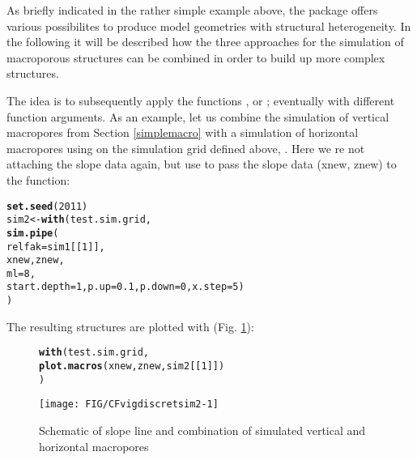 \documentclass[article,nojss]{jss}\usepackage[]{graphicx}\usepackage[]{xcolor}
\makeatletter
\def\maxwidth{ %
  \ifdim\Gin@nat@width>\linewidth
    \linewidth
  \else
    \Gin@nat@width
  \fi
}
\newcommand{\hlnum}[1]{\textcolor[rgb]{0.686,0.059,0.569}{#1}}%
\newcommand{\hldef}[1]{\textcolor[rgb]{0.345,0.345,0.345}{#1}}%
\newcommand{\hlkwb}[1]{\textcolor[rgb]{0.69,0.353,0.396}{#1}}%
\newcommand{\hlkwc}[1]{\textcolor[rgb]{0.333,0.667,0.333}{#1}}%
\newcommand{\hlkwd}[1]{\textcolor[rgb]{0.737,0.353,0.396}{\textbf{#1}}}%
\newenvironment{kframe}{%
 \def\at@end@of@kframe{}%
 \ifinner\ifhmode%
  \def\at@end@of@kframe{\end{minipage}}%
  \begin{minipage}{\columnwidth}%
 \fi\fi%
 \def\FrameCommand##1{\hskip\@totalleftmargin \hskip-\fboxsep
 \colorbox{shadecolor}{##1}\hskip-\fboxsep
     \hskip-\linewidth \hskip-\@totalleftmargin \hskip\columnwidth}%
 \MakeFramed {\advance\hsize-\width
   \@totalleftmargin\z@ \linewidth\hsize
   \@setminipage}}%
 {\par\unskip\endMakeFramed%
 \at@end@of@kframe}
\newenvironment{knitrout}{}{} %
\makeatother
\begin{document}
As briefly indicated in the rather simple example above, the  package offers 
various possibilites to produce model geometries with structural heterogeneity.    
In the following it will be described how the three approaches for the simulation of 
macroporous structures can be combined in order to build up more complex structures.

The idea is to subsequently apply the functions ,  or 
; eventually with different function arguments. As an example, let us 
combine the simulation of vertical macropores from Section \ref{simplemacro} 
with a simulation of horizontal macropores using  on the simulation grid 
defined above, . Here we re not attaching the slope data again, but use  to pass the slope data (xnew, znew) to the function:

\begin{knitrout}
\color{fgcolor}\begin{kframe}
\begin{alltt}
  \hlkwd{set.seed}\hldef{(}\hlnum{2011}\hldef{)}
  \hldef{sim2} \hlkwb{<-} \hlkwd{with}\hldef{(test.sim.grid,}
               \hlkwd{sim.pipe}\hldef{(}
                  \hlkwc{relfak} \hldef{= sim1[[}\hlnum{1}\hldef{]],}
                  \hldef{xnew, znew,}
                  \hlkwc{ml} \hldef{=} \hlnum{8}\hldef{,}
                  \hlkwc{start.depth}\hldef{=}\hlnum{1}\hldef{,} \hlkwc{p.up} \hldef{=}\hlnum{0.1}\hldef{,} \hlkwc{p.down}\hldef{=}\hlnum{0}\hldef{,} \hlkwc{x.step}\hldef{=}\hlnum{5}\hldef{)}
  \hldef{)}
\end{alltt}
\end{kframe}
\end{knitrout}


The resulting structures are plotted with  (Fig. \ref{fig:macsim2}):

\begin{figure}[h]
\begin{center}
\begin{knitrout}
\color{fgcolor}\begin{kframe}
\begin{alltt}
\hlkwd{with}\hldef{(test.sim.grid,}
      \hlkwd{plot.macros}\hldef{(xnew, znew, sim2[[}\hlnum{1}\hldef{]])}
\hldef{)}
\end{alltt}
\end{kframe}
\texttt{[image: FIG/CFvigdiscretsim2-1]} 
\end{knitrout}
\caption{\label{fig:macsim2} Schematic of slope line and combination of simulated vertical
and horizontal macropores}
\end{center}
\end{figure}
\end{document}
